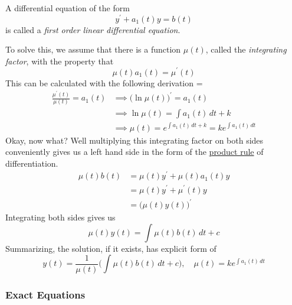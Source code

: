 \documentclass{article}
\newcounter{definition}[section]
\begin{document}
      \begin{definition}
        \label{def:first-order-linear-deq-and-solution}
      A differential equation of the form 
      \begin{equation}
        y^\prime + a_1 (t) y = b(t)
      \end{equation}
      is called a \textit{first order linear differential equation}. 

      To solve this, we assume that there is a function $\mu (t)$, called the \textit{integrating factor}, with the property that 
      \begin{equation}
        \mu(t) a_1 (t) = \mu^\prime (t)
      \end{equation}
      This can be calculated with the following derivation =
      \begin{align*}
          \frac{\mu^\prime (t)}{\mu (t)} = a_1 (t) & \implies \big( \ln{\mu(t)}\big)^\prime = a_1 (t) \\
          & \implies \ln{\mu(t)} = \int a_1 (t) \, dt + k \\
          & \implies \mu(t) = e^{\int a_1(t)\,dt + k} = k e^{\int a_1 (t) \,dt}
      \end{align*}
      Okay, now what? Well multiplying this integrating factor on both sides conveniently gives us a left hand side in the form of the \hyperref[mv-thm:product-rule-2]{product rule} of differentiation. 
      \begin{align*}
           \mu(t) b(t) & = \mu(t) y^\prime + \mu(t) a_1 (t) y \\
           & = \mu(t) y^\prime + \mu^\prime (t) y \\
           & = \big( \mu(t) y(t) \big)^\prime
      \end{align*}
      Integrating both sides gives us 
      \begin{equation}
        \mu(t) y(t) = \int \mu(t) b(t) \,dt + c
      \end{equation}
      Summarizing, the solution, if it exists, has explicit form of
      \begin{equation}
        y(t) = \frac{1}{\mu(t)} \bigg(\int \mu(t) b(t) \,dt + c\bigg), \quad \mu(t) = k e^{\int a_1 (t)\,dt}
      \end{equation}
      \end{definition}

    \subsubsection{Exact Equations}
\end{document}

